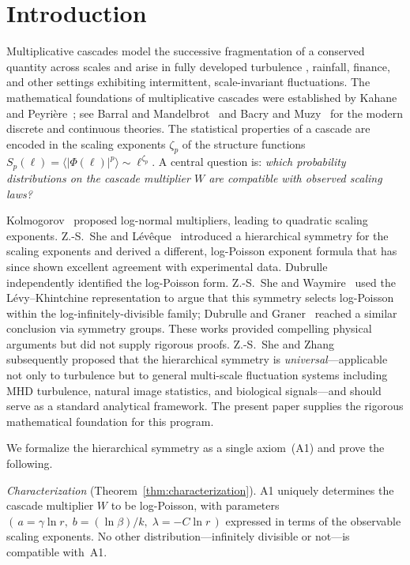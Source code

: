 \documentclass[12pt]{amsart}
\theoremstyle{definition}
\theoremstyle{remark}
\begin{document}
\section{Introduction}

Multiplicative cascades model the successive fragmentation of a
conserved quantity across scales and arise in fully developed
turbulence \cite{K62,Man74}, rainfall, finance, and other settings
exhibiting intermittent, scale-invariant fluctuations.  The
mathematical foundations of multiplicative cascades were established
by Kahane and Peyri\`ere~\cite{KP76}; see Barral and
Mandelbrot~\cite{BM02} and Bacry and Muzy~\cite{BM03} for the modern
discrete and continuous theories.  The statistical properties of a
cascade are encoded in the scaling exponents $\zeta_p$ of the
structure functions $S_p(\ell) = \langle |\Phi(\ell)|^p \rangle \sim
\ell^{\zeta_p}$.  A central question is: \emph{which probability
distributions on the cascade multiplier $W$ are compatible with
observed scaling laws?}

Kolmogorov~\cite{K62} proposed log-normal multipliers, leading to
quadratic scaling exponents.  Z.-S.~She and
L\'ev\^eque~\cite{SL94} introduced a hierarchical symmetry for the
scaling exponents and derived a different, log-Poisson exponent
formula that has since shown excellent agreement with experimental
data.  Dubrulle~\cite{Dub94} independently identified the log-Poisson
form.  Z.-S.~She and Waymire~\cite{SW95} used the
L\'evy--Khintchine representation to argue that this symmetry selects
log-Poisson within the log-infinitely-divisible family; Dubrulle and
Graner~\cite{DG96} reached a similar conclusion via symmetry groups.
These works provided compelling physical arguments but did not supply
rigorous proofs.  Z.-S.~She and Zhang~\cite{SZ09} subsequently
proposed that the hierarchical symmetry is \emph{universal}---applicable
not only to turbulence but to general multi-scale fluctuation systems
including MHD turbulence, natural image statistics, and biological
signals---and should serve as a standard analytical framework.  The
present paper supplies the rigorous mathematical foundation for this
program.

We formalize the hierarchical symmetry as a single axiom~(A1) and
prove the following.

\emph{Characterization}
(Theorem~\ref{thm:characterization}).  A1 uniquely determines the
cascade multiplier $W$ to be log-Poisson, with parameters
$(\,a = \gamma\ln r,\; b = (\ln\beta)/k,\; \lambda = -C\ln r\,)$
expressed in terms of the observable scaling exponents.  No other
distribution---infinitely divisible or not---is compatible with~A1.
\end{document}
